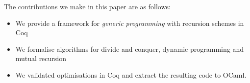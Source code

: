 \documentclass[anonymous, a4paper, UKenglish, cleveref, autoref, thm-restate]{lipics-v2021}
\newcommand{\mpav}[1]{\textcolor{red}{\textsc{Marco}: #1}}
\newcommand{\cata}[1]{\lbans #1 \rbans}
\newcommand{\ana}[1]{\llens #1 \rlens}
\newcommand{\comp}{\cdot}
\newcommand{\operator}[1]{\textsf{#1}}
\newcommand{\InOp}{\operator{in}^{\circ}}
\newcommand{\OutOp}{\operator{out}^{\circ}}
\begin{document}
The contributions we make in this paper are as follows:
\begin{itemize}
  \item We provide a framework for \emph{generic programming} with recursion
schemes in Coq
  \item We formalise algorithms for divide and conquer, dynamic programming and
mutual recursion
  \item We validated optimisations in Coq and extract the resulting code to
OCaml.
\end{itemize}



\end{document}
